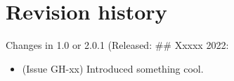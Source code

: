 \chapter{Revision history}
\label{Chp:RevHistory}

Changes in 1.0 or 2.0.1 (Released: \#\# Xxxxx 2022:
\begin{itemize}
\item (Issue GH-xx) Introduced something cool.
\end{itemize}
 

